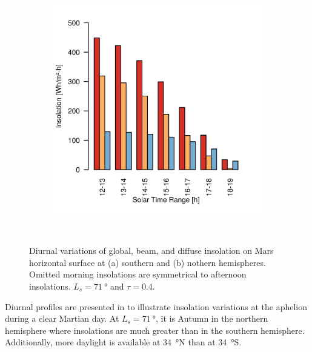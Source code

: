 \begin{figure}[h]
\begin{subfigure}[t]{\subfigureWidth}
            \includegraphics[height=\graphicsHeight]{sections/mars-solar-energy/solar-radiation/plots/ih-ibh-and-idh-variation-2-for-ls-71-phi-34-tau-04-and-albedo-027.png}
            \label{fig:plot:sub:insolation-phi-p34}
    \end{subfigure}\\[0.8ex]
    \caption[Diurnal insolation variations on Mars horizontal surface]
    {Diurnal variations of global, beam, and diffuse insolation on Mars horizontal surface at (a) southern and (b) nothern hemispheres. Omitted morning insolations are symmetrical to afternoon insolations. $L_{s} = \SI{71}{\degree}$ and $\tau = 0.4$.}
    \label{fig:plot:insolation-phi}
\vspace{-2ex}
\end{figure}

\vspace{0.5cm}

Diurnal profiles are presented in  to illustrate insolation variations at the aphelion during a clear Martian day. At $L_{s} = \SI{71}{\degree}$, it is Autumn in the northern hemisphere where insolations are much greater than in the southern hemisphere. Additionally, more daylight is available at \SI{34}{\degree}N than at \SI{34}{\degree}S.

